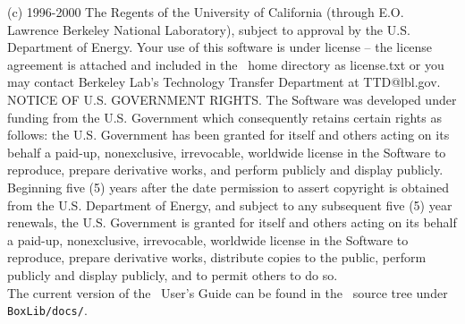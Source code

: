 \noindent (c) 1996-2000 The Regents of the University of California (through
E.O. Lawrence Berkeley National Laboratory), subject to approval by
the U.S. Department of Energy.  Your use of this software is under
license -- the license agreement is attached and included in the
\BoxLib\ home directory as license.txt or you may contact Berkeley Lab's Technology
Transfer Department at TTD@lbl.gov.  NOTICE OF U.S. GOVERNMENT RIGHTS.
The Software was developed under funding from the U.S. Government
which consequently retains certain rights as follows: the
U.S. Government has been granted for itself and others acting on its
behalf a paid-up, nonexclusive, irrevocable, worldwide license in the
Software to reproduce, prepare derivative works, and perform publicly
and display publicly.  Beginning five (5) years after the date
permission to assert copyright is obtained from the U.S. Department of
Energy, and subject to any subsequent five (5) year renewals, the
U.S. Government is granted for itself and others acting on its behalf
a paid-up, nonexclusive, irrevocable, worldwide license in the
Software to reproduce, prepare derivative works, distribute copies to
the public, perform publicly and display publicly, and to permit
others to do so.\\

\noindent The current version of the \BoxLib\ User's Guide can be found in 
the \BoxLib\ source tree under {\tt BoxLib/docs/}.
